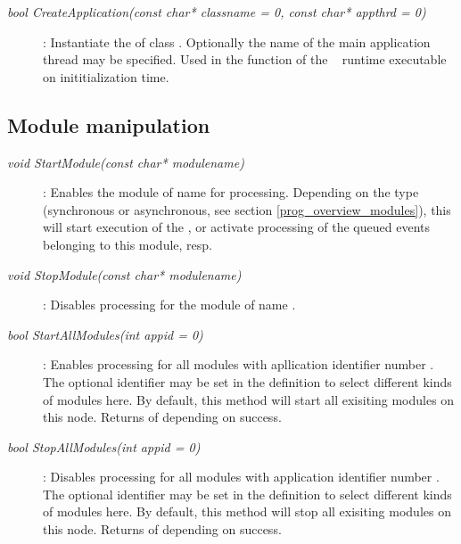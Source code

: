 \begin{description}
\item[\em bool CreateApplication\small (const char* classname = 0, const char* appthrd = 0)] :
Instantiate the  of class . Optionally
the name  of the main application thread may be specified.
Used in the  function of the \dabc~ runtime executable on
inititialization time.

\end{description}	 


\subsection{Module manipulation}	

\begin{description}

\item[\em void StartModule\small (const char* modulename)] :
Enables the module of name  for processing.
Depending on the  type (synchronous or asynchronous,
see section \ref{prog_overview_modules}), this will start
execution of the , or activate processing of the
queued events belonging to this module, resp.

\item[\em void StopModule\small (const char* modulename)] :
Disables processing for the module of name .


\item[\em bool StartAllModules\small (int appid = 0)] :
Enables processing for all modules with apllication identifier number .
The optional identifier  may be set in the  definition
to select different kinds of modules here. By default, this method will
start all exisiting modules on this node.
Returns  of  depending on success.

\item[\em bool StopAllModules\small (int appid = 0)] :
Disables processing for all modules with application identifier number .
The optional identifier  may be set in the  definition
to select different kinds of modules here. By default, this method will
stop all exisiting modules on this node.
Returns  of  depending on success.


\end{description}
